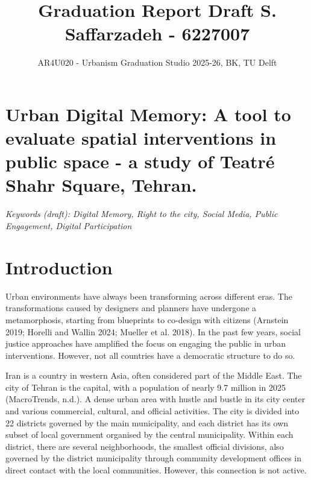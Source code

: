 \documentclass[
  letterpaper,
  DIV=11,
  numbers=noendperiod]{scrartcl}
\title{Graduation Report Draft S. Saffarzadeh - 6227007}
\subtitle{AR4U020 - Urbanism Graduation Studio 2025-26, BK, TU Delft}
\author{}
\date{}
\renewcommand*\contentsname{Table of contents}
\newcommand\contentsname{Table of contents}
\begin{document}
\maketitle

\renewcommand*\contentsname{Table of contents}
{
\hypersetup{linkcolor=}
\setcounter{tocdepth}{3}
\tableofcontents
}

\section{\texorpdfstring{\textbf{Urban Digital Memory: A tool to
evaluate spatial interventions in public space - a study of Teatré Shahr
Square,
Tehran.}}{Urban Digital Memory: A tool to evaluate spatial interventions in public space - a study of Teatré Shahr Square, Tehran.}}\label{urban-digital-memory-a-tool-to-evaluate-spatial-interventions-in-public-space---a-study-of-teatruxe9-shahr-square-tehran.}

\emph{Keywords (draft): Digital Memory, Right to the city, Social Media,
Public Engagement, Digital Participation}

\newpage{}

\section{Introduction}\label{introduction}

Urban environments have always been transforming across different eras.
The transformations caused by designers and planners have undergone a
metamorphosis, starting from blueprints to co-design with citizens
(Arnstein 2019; Horelli and Wallin 2024; Mueller et al. 2018). In the
past few years, social justice approaches have amplified the focus on
engaging the public in urban interventions. However, not all countries
have a democratic structure to do so.

Iran is a country in western Asia, often considered part of the Middle
East. The city of Tehran is the capital, with a population of nearly 9.7
million in 2025 (MacroTrends, n.d.). A dense urban area with hustle and
bustle in its city center and various commercial, cultural, and official
activities. The city is divided into 22 districts governed by the main
municipality, and each district has its own subset of local government
organised by the central municipality. Within each district, there are
several neighborhoods, the smallest official divisions, also governed by
the district municipality through community development offices in
direct contact with the local communities. However, this connection is
not active.
\end{document}
